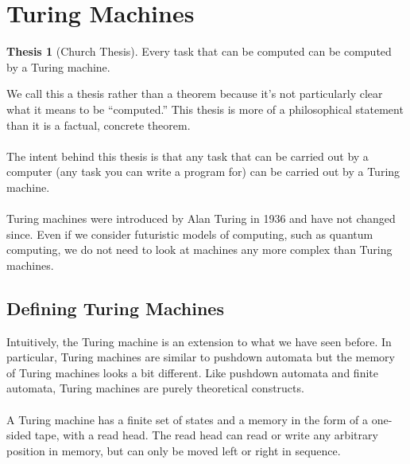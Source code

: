 \documentclass[]{article}
\theoremstyle{definition}
\newtheorem*{thesis}{Thesis}
\newcommand{\lecture}[1]{\marginpar{{\footnotesize $\leftarrow$ \underline{#1}}}}
\begin{document}
  \section{Turing Machines} \lecture{November 12, 2013}
    \begin{thesis}[Church Thesis]
      Every task that can be computed can be computed by a Turing machine.
    \end{thesis}

    We call this a thesis rather than a theorem because it's not particularly clear what it means to be ``computed.'' This thesis is more of a philosophical statement than it is a factual, concrete theorem.
    \\ \\
    The intent behind this thesis is that any task that can be carried out by a computer (any task you can write a program for) can be carried out by a Turing machine.
    \\ \\
    Turing machines were introduced by Alan Turing in 1936 and have not changed since. Even if we consider futuristic models of computing, such as quantum computing, we do not need to look at machines any more complex than Turing machines.

    \subsection{Defining Turing Machines}
      Intuitively, the Turing machine is an extension to what we have seen before. In particular, Turing machines are similar to pushdown automata but the memory of Turing machines looks a bit different. Like pushdown automata and finite automata, Turing machines are purely theoretical constructs.
      \\ \\
      A Turing machine has a finite set of states and a memory in the form of a one-sided tape, with a read head. The read head can read or write any arbitrary position in memory, but can only be moved left or right in sequence.
\end{document}
